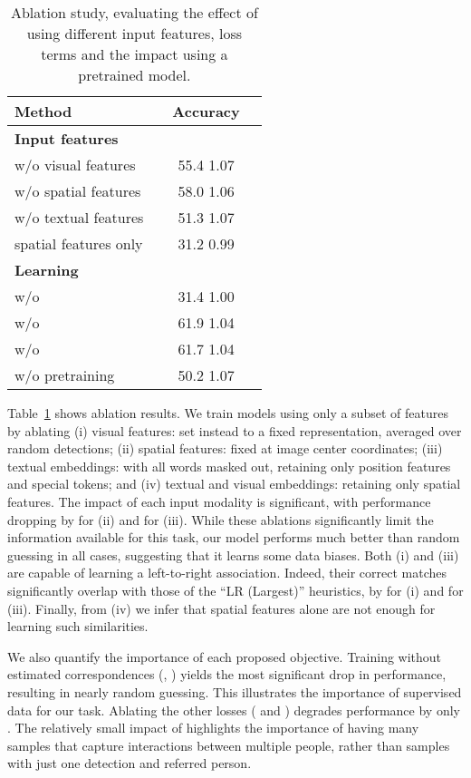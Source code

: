 \begin{table}[t]
\centering
\setlength{\tabcolsep}{3.1pt}
\def\arraystretch{0.95}
\begin{tabularx}{0.655\columnwidth}{lccc}
\toprule
  Method  && Accuracy        \\ \midrule
  \textbf{Input features} \\
 \quad w/o visual features && 55.4  1.07  \\
 \quad w/o spatial features &&  58.0  1.06 \\
 \quad w/o textual features && 51.3  1.07 \\
  \quad spatial features only && 31.2  0.99 \\
 \midrule
 \textbf{Learning} \\
 \quad w/o  && 31.4  1.00 \\
  \quad  w/o  &&  61.9  1.04 \\
    \quad  w/o  && 61.7  1.04 \\
 \quad w/o pretraining &&  50.2  1.07 \\
\bottomrule
\end{tabularx}
\vspace{3pt}
\caption{Ablation study, evaluating the effect of using different input features, loss terms and the impact using a pretrained model. }\label{tab:ablations}
\end{table}
 
Table~\ref{tab:ablations} shows ablation results. 
We train models using only a subset of features by ablating (i) visual features: set instead to a fixed representation, averaged over  random detections; (ii) spatial features: fixed at image center coordinates; (iii) textual embeddings: with all words masked out, retaining only position features and special \NAME tokens; and (iv) textual and visual embeddings: retaining only spatial features.
The impact of each input modality is significant, with performance dropping by  for (ii) and  for (iii). While these ablations significantly limit the information available for this task, our model performs much better than random guessing in all cases, suggesting that it learns some data biases. Both (i) and (iii) are capable of learning a left-to-right association. Indeed, their correct matches significantly overlap with those of the ``LR (Largest)'' heuristics, by  for (i) and  for (iii). Finally, from (iv) we infer that spatial features alone are not enough for learning such similarities.

We also quantify the importance of each proposed objective. Training without estimated correspondences (\ie, ) yields the most significant drop in performance, resulting in nearly random guessing. This illustrates the importance of supervised data for our task. Ablating the other losses ( and ) degrades performance by only . The relatively small impact of  highlights the importance of having many samples that capture interactions between multiple people, rather than samples with just one detection and referred person.

